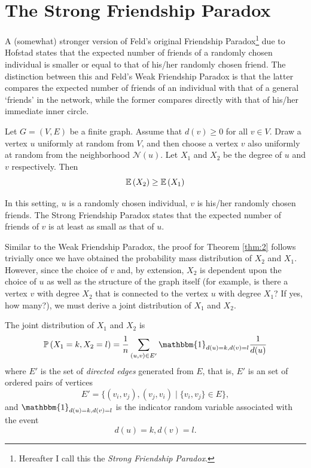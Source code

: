 \documentclass[12pt,reqno, a4]{amsart}
\begin{document}
\section{The Strong Friendship Paradox}
A (somewhat) stronger version of Feld's original Friendship Paradox\footnote{Hereafter I call this the \textit{Strong Friendship Paradox}.} due to Hofstad \cite{hofstad_random_2016} states that the expected number of friends of a randomly chosen individual is smaller or equal to that of his/her randomly chosen friend. The distinction between this and Feld's Weak Friendship Paradox is that the latter compares the expected number of friends of an individual with that of a general `friends' in the network, while the former compares directly with that of his/her immediate inner circle.
\begin{theorem} \label{thm:2}
    Let $G = (V, E)$ be a finite graph. Assume that $d(v) \geq 0$ for all $v \in V$. Draw a vertex $u$ uniformly at random from $V$, and then choose a vertex $v$ also uniformly at random from the neighborhood $\mathcal{N}(u)$. Let $X_1$ and $X_2$ be the degree of $u$ and $v$ respectively. Then
    \begin{equation}
        \mathbb{E}\left( X_2 \right) \geq \mathbb{E}\left( X_1 \right)
    \end{equation}
\end{theorem}
\begin{remark}
    In this setting, $u$ is a randomly chosen individual, $v$ is his/her randomly chosen friends. The Strong Friendship Paradox states that the expected number of friends of $v$ is at least as small as that of $u$.
\end{remark}
Similar to the Weak Friendship Paradox, the proof for Theorem \ref{thm:2} follows trivially once we have obtained the probability mass distribution of $X_2$ and $X_1$. However, since the choice of $v$ and, by extension, $X_2$ is dependent upon the choice of $u$ as well as the structure of the graph itself (for example, is there a vertex $v$ with degree $X_2$ that is connected to the vertex $u$ with degree $X_1$? If yes, how many?), we must derive a joint distribution of $X_1$ and $X_2$.
\begin{lemma} \label{lemma 2}
    The joint distribution of $X_1$ and $X_2$ is 
    \begin{equation}
        \pr{X_1 = k, X_2 = l} = \frac{1}{n} \sum_{(u, v) \in E'} \mathbbm{1}_{d(u) = k, d(v) = l} \frac{1}{d(u)}
    \end{equation}
    where $E'$ is the set of \textit{directed edges} generated from $E$, that is, $E'$ is an set of ordered pairs of vertices \[
    E' = \{(v_i, v_j), (v_j, v_i) \mid \{v_i, v_j\} \in E\},
    \] and $\mathbbm{1}_{d(u) = k, d(v) = l}$ is the indicator random variable associated with the event \[d(u) = k, d(v) = l.\]
\end{lemma}
\end{document}
